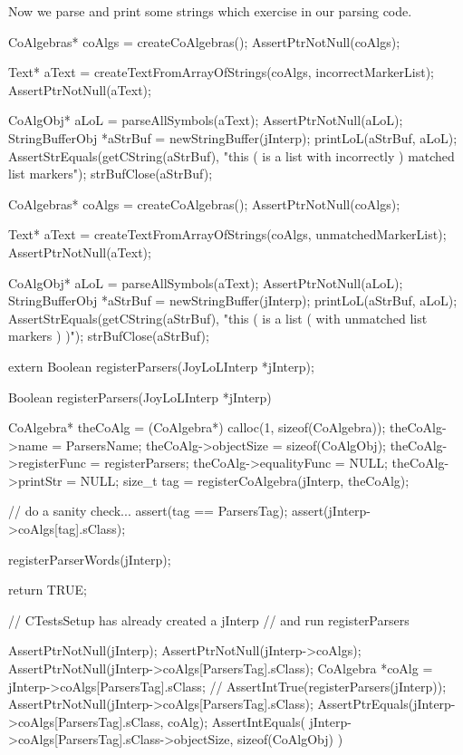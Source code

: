 Now we parse and print some strings which exercise  
in our parsing code. 

\startCTest
  CoAlgebras* coAlgs = createCoAlgebras();
  AssertPtrNotNull(coAlgs);

  Text* aText = createTextFromArrayOfStrings(coAlgs, incorrectMarkerList);
  AssertPtrNotNull(aText);

  CoAlgObj* aLoL = parseAllSymbols(aText);
  AssertPtrNotNull(aLoL);
  StringBufferObj *aStrBuf = newStringBuffer(jInterp);
  printLoL(aStrBuf, aLoL);
  AssertStrEquals(getCString(aStrBuf),
    "this ( is a list with incorrectly ) matched list markers");
  strBufClose(aStrBuf);
\stopCTest
\ignoreTestCase

\startCTest
  CoAlgebras* coAlgs = createCoAlgebras();
  AssertPtrNotNull(coAlgs);

  Text* aText = createTextFromArrayOfStrings(coAlgs, unmatchedMarkerList);
  AssertPtrNotNull(aText);

  CoAlgObj* aLoL = parseAllSymbols(aText);
  AssertPtrNotNull(aLoL);
  StringBufferObj *aStrBuf = newStringBuffer(jInterp);
  printLoL(aStrBuf, aLoL);
  AssertStrEquals(getCString(aStrBuf),
    "this ( is a list ( with unmatched list markers ) )");
  strBufClose(aStrBuf);
\stopCTest
\ignoreTestCase
\stopTestSuite

\startTestSuite[registerParsers]

\startCHeader
extern Boolean registerParsers(JoyLoLInterp *jInterp);
\stopCHeader
{}

\startCCode
Boolean registerParsers(JoyLoLInterp *jInterp) {
  CoAlgebra* theCoAlg    = (CoAlgebra*) calloc(1, sizeof(CoAlgebra));
  theCoAlg->name         = ParsersName;
  theCoAlg->objectSize   = sizeof(CoAlgObj);
  theCoAlg->registerFunc = registerParsers;
  theCoAlg->equalityFunc = NULL;
  theCoAlg->printStr     = NULL;
  size_t tag = registerCoAlgebra(jInterp, theCoAlg);
  
  // do a sanity check...
  assert(tag == ParsersTag);
  assert(jInterp->coAlgs[tag].sClass);
  
  registerParserWords(jInterp);
    
  return TRUE;
}
\stopCCode


\startCTest
  // CTestsSetup has already created a jInterp
  // and run registerParsers
  
  AssertPtrNotNull(jInterp);
  AssertPtrNotNull(jInterp->coAlgs);
  AssertPtrNotNull(jInterp->coAlgs[ParsersTag].sClass);
  CoAlgebra *coAlg = jInterp->coAlgs[ParsersTag].sClass;
//  AssertIntTrue(registerParsers(jInterp));
  AssertPtrNotNull(jInterp->coAlgs[ParsersTag].sClass);
  AssertPtrEquals(jInterp->coAlgs[ParsersTag].sClass, coAlg);
  AssertIntEquals(
    jInterp->coAlgs[ParsersTag].sClass->objectSize,
    sizeof(CoAlgObj)
  )
\stopCTest
\stopTestCase
\stopTestSuite
